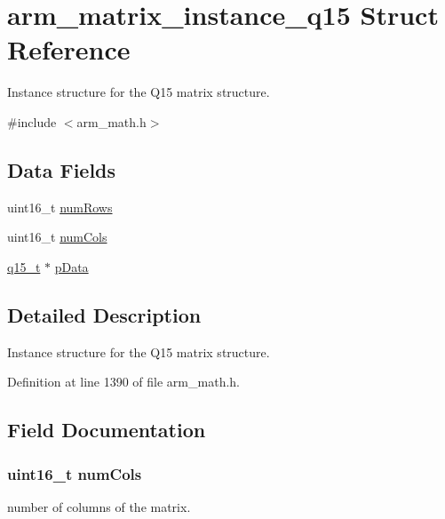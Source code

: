 \hypertarget{structarm__matrix__instance__q15}{}\section{arm\+\_\+matrix\+\_\+instance\+\_\+q15 Struct Reference}
\label{structarm__matrix__instance__q15}


Instance structure for the Q15 matrix structure.  




{\ttfamily \#include $<$arm\+\_\+math.\+h$>$}

\subsection*{Data Fields}
\begin{DoxyCompactItemize}
\item 
uint16\+\_\+t \hyperlink{structarm__matrix__instance__q15_a1bcf80ccdc2acc29198f1592ae300390}{num\+Rows}
\item 
uint16\+\_\+t \hyperlink{structarm__matrix__instance__q15_a4bb5ec0d13eb4c9cf887aa8366a44117}{num\+Cols}
\item 
\hyperlink{arm__math_8h_ab5a8fb21a5b3b983d5f54f31614052ea}{q15\+\_\+t} $\ast$ \hyperlink{structarm__matrix__instance__q15_a817ede38365e63e561a12069c6c5c087}{p\+Data}
\end{DoxyCompactItemize}


\subsection{Detailed Description}
Instance structure for the Q15 matrix structure. 

Definition at line 1390 of file arm\+\_\+math.\+h.



\subsection{Field Documentation}
\subsubsection[{\texorpdfstring{num\+Cols}{numCols}}]{\setlength{\rightskip}{0pt plus 5cm}uint16\+\_\+t num\+Cols}\hypertarget{structarm__matrix__instance__q15_a4bb5ec0d13eb4c9cf887aa8366a44117}{}\label{structarm__matrix__instance__q15_a4bb5ec0d13eb4c9cf887aa8366a44117}
number of columns of the matrix. 

